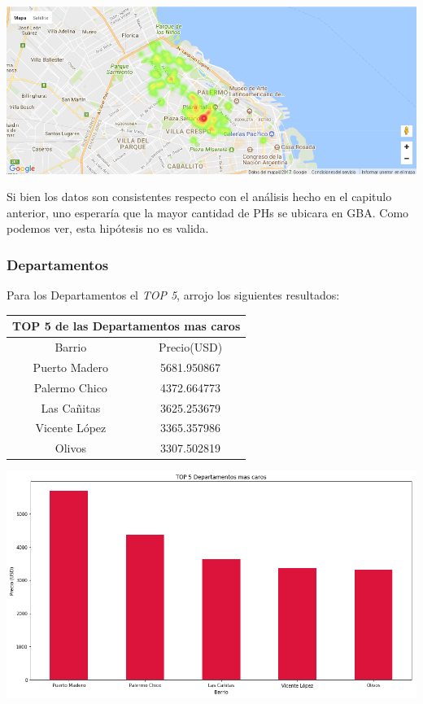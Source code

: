 \documentclass[a4paper, 10pt]{article}
\begin{document}
				\begin{center}
   		    				\includegraphics[width=\textwidth]{images/ubicPHc}
				\end{center}	
				
				Si bien los datos son consistentes respecto con el análisis hecho en el capitulo anterior, uno esperaría que la mayor cantidad de PHs se ubicara en GBA. Como podemos ver, esta hipótesis no es valida.
				
				\subsubsection{Departamentos}
				Para los Departamentos el \emph{TOP 5}, arrojo los siguientes resultados:
				
					\begin{center}
						\begin{tabular}{ |c|c| }
							\hline
							\multicolumn{2}{|c|}{TOP 5 de las Departamentos mas caros}\\
							\hline
							\hline
							Barrio & Precio(USD)\\
							\hline
							Puerto Madero & 5681.950867 \\
							Palermo Chico & 4372.664773 \\
							Las Cañitas & 3625.253679 \\
							Vicente López & 3365.357986 \\
							Olivos & 3307.502819 \\
							\hline
						\end{tabular}
					\end{center}
				
				\begin{center}
   		    				\includegraphics[width=\textwidth]{images/topDc}
				\end{center}
				
\end{document}
